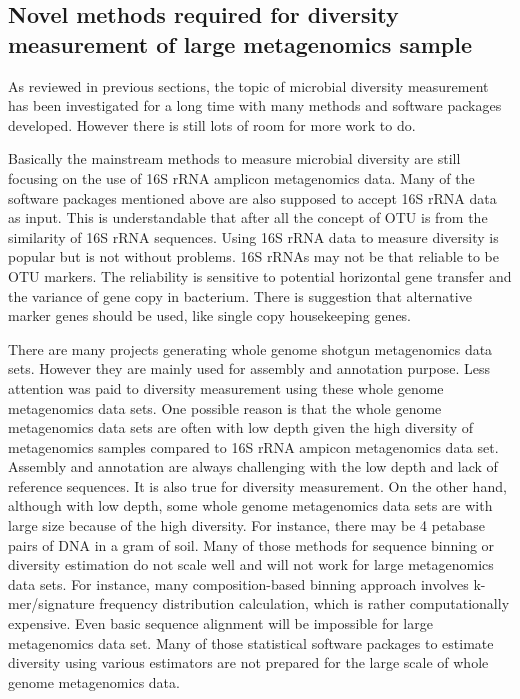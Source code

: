 \subsection{Novel methods required for diversity measurement of large metagenomics sample}

As reviewed in previous sections, the topic of microbial diversity measurement has been investigated 
for a long time with many methods and software packages developed. However there is still lots of 
room for more work to do.

Basically the mainstream methods to measure microbial diversity are still focusing on the use
of 16S rRNA amplicon metagenomics data. Many of the software packages
mentioned above are also supposed to accept 16S rRNA data as input. This is understandable that
after all the concept of OTU is from the similarity of 16S rRNA sequences. Using 16S rRNA data to measure
diversity is popular but is not without problems. 16S rRNAs may not be that reliable to be OTU 
markers. The reliability is sensitive to potential horizontal gene transfer and the variance of gene copy
in bacterium. There is suggestion that alternative marker genes should be used, like single copy housekeeping genes.



There are many projects generating whole genome shotgun metagenomics data sets. However they are 
mainly used for assembly and annotation purpose. Less attention was paid to diversity measurement
using these whole genome metagenomics data sets. One possible reason is that the whole genome metagenomics
data sets are often with low depth given the high diversity of metagenomics samples compared to 16S rRNA
ampicon metagenomics data set. Assembly and annotation are always challenging with the low depth and lack of 
reference sequences. It is also true for diversity measurement. On the other hand, although with low depth, some whole genome metagenomics 
data sets are with large size because of the high diversity. For instance, there may be 4 petabase
pairs of DNA in a gram of soil\cite{Zarraonaindia:2013aa}. Many of those methods for sequence binning or diversity 
estimation do not scale well and will not work for large metagenomics data sets. For instance,
many composition-based binning approach involves k-mer/signature frequency distribution calculation, which is 
rather computationally expensive. Even basic sequence alignment will be impossible for large metagenomics data set.
Many of those statistical software packages to estimate diversity using various estimators are not prepared 
for the large scale of whole genome metagenomics data. 

